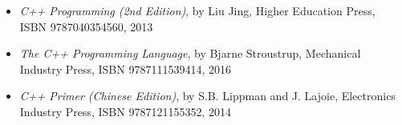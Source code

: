 \begin{itemize}[topsep=0pt, partopsep=0pt, parsep=0pt, itemsep=1pt]
    \item \textit{C++ Programming (2nd Edition)}, by Liu Jing, Higher Education Press, ISBN 9787040354560, 2013
    \item \textit{The C++ Programming Language}, by Bjarne Stroustrup, Mechanical Industry Press, ISBN 9787111539414, 2016
    \item \textit{C++ Primer (Chinese Edition)}, by S.B. Lippman and J. Lajoie, Electronics Industry Press, ISBN 9787121155352, 2014
\end{itemize}
